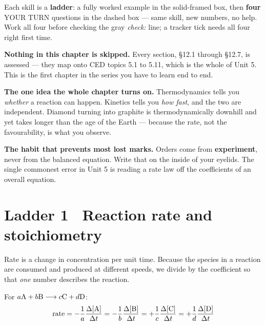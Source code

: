 \documentclass{apchem-worksheet}
\begin{document}
\apctitleblock

\begin{apcnote}
Each skill is a \textbf{ladder}: a fully worked example in the
solid-framed box, then \textbf{four} YOUR TURN questions in the dashed
box --- same skill, new numbers, no help. Work all four before checking
the gray \emph{check:} line; a tracker tick needs all four right first
time.

\textbf{Nothing in this chapter is skipped.} Every section, \S12.1
through \S12.7, is assessed --- they map onto CED topics 5.1 to 5.11,
which is the whole of Unit 5. This is the first chapter in the series
you have to learn end to end.

\textbf{The one idea the whole chapter turns on.} Thermodynamics tells
you \emph{whether} a reaction can happen. Kinetics tells you
\emph{how fast}, and the two are independent. Diamond turning into
graphite is thermodynamically downhill and yet takes longer than the age
of the Earth --- because the rate, not the favourability, is what you
observe.

\textbf{The habit that prevents most lost marks.} Orders come from
\textbf{experiment}, never from the balanced equation. Write that on the
inside of your eyelids. The single commonest error in Unit 5 is reading
a rate law off the coefficients of an overall equation.
\end{apcnote}

\section*{\sffamily Ladder 1 \textbullet\ Reaction rate and
stoichiometry}

Rate is a change in concentration per unit time. Because the species in
a reaction are consumed and produced at different speeds, we divide by
the coefficient so that \emph{one} number describes the reaction.

For $a\ce{A} + b\ce{B} \longrightarrow c\ce{C} + d\ce{D}$:
\[ \text{rate}
   = -\frac{1}{a}\frac{\Delta[\ce{A}]}{\Delta t}
   = -\frac{1}{b}\frac{\Delta[\ce{B}]}{\Delta t}
   = +\frac{1}{c}\frac{\Delta[\ce{C}]}{\Delta t}
   = +\frac{1}{d}\frac{\Delta[\ce{D}]}{\Delta t} \]
\end{document}
